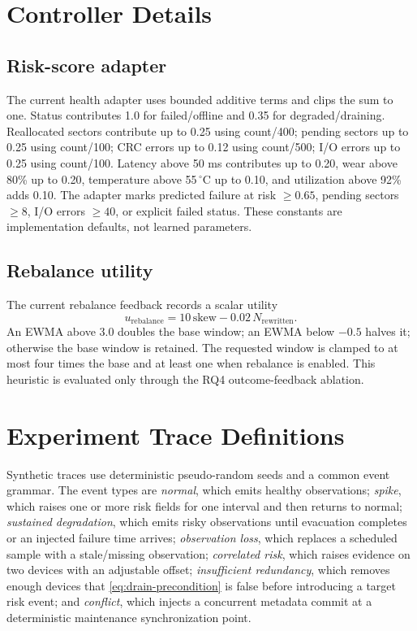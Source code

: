 \section{Controller Details}
\label{app:controller-details}

\subsection{Risk-score adapter}
The current health adapter uses bounded additive terms and clips the sum to one. Status contributes 1.0 for failed/offline and 0.35 for degraded/draining. Reallocated sectors contribute up to 0.25 using count/400; pending sectors up to 0.25 using count/100; CRC errors up to 0.12 using count/500; I/O errors up to 0.25 using count/100. Latency above 50 ms contributes up to 0.20, wear above 80\% up to 0.20, temperature above 55\,$^\circ$C up to 0.10, and utilization above 92\% adds 0.10. The adapter marks predicted failure at risk $\ge 0.65$, pending sectors $\ge 8$, I/O errors $\ge 40$, or explicit failed status. These constants are implementation defaults, not learned parameters.

\subsection{Rebalance utility}
The current rebalance feedback records a scalar utility
\begin{equation}
  u_{\mathrm{rebalance}} = 10\,\mathrm{skew} - 0.02\,N_{\mathrm{rewritten}}.
\end{equation}
An EWMA above 3.0 doubles the base window; an EWMA below $-0.5$ halves it; otherwise the base window is retained. The requested window is clamped to at most four times the base and at least one when rebalance is enabled. This heuristic is evaluated only through the RQ4 outcome-feedback ablation.

\section{Experiment Trace Definitions}
\label{app:traces}

Synthetic traces use deterministic pseudo-random seeds and a common event grammar. The event types are \emph{normal}, which emits healthy observations; \emph{spike}, which raises one or more risk fields for one interval and then returns to normal; \emph{sustained degradation}, which emits risky observations until evacuation completes or an injected failure time arrives; \emph{observation loss}, which replaces a scheduled sample with a stale/missing observation; \emph{correlated risk}, which raises evidence on two devices with an adjustable offset; \emph{insufficient redundancy}, which removes enough devices that \cref{eq:drain-precondition} is false before introducing a target risk event; and \emph{conflict}, which injects a concurrent metadata commit at a deterministic maintenance synchronization point.

